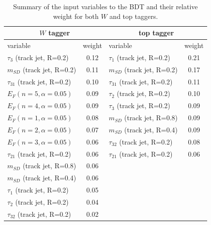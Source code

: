 \documentclass[a4paper,11pt]{article}
\newcommand{\mSD}{\ensuremath{m_{\ensuremath{SD}}}}
\begin{document}
\begin{table}[!htb]\centering
\begin{tabular}{| l | c | l | c |}
\hline
  \multicolumn{2}{|c|}{$W$ tagger}  & \multicolumn{2}{c|}{top tagger} \\
  \hline
 variable & weight & variable & weight \\
\hline
 $\tau_3$ (track jet, R=0.2)      & 0.12      & $\tau_1$ (track jet, R=0.2) & 0.21  \\
 $\mSD$  (track jet, R=0.2)      & 0.11      & $\mSD$  (track jet, R=0.2) & 0.17 \\
 $\tau_{31}$  (track jet, R=0.2) & 0.10     & $\tau_{31}$  (track jet, R=0.2)  & 0.11 \\
 $E_{F}(n=5,\alpha=0.05)$                               & 0.09     &  $\tau_2$ (track jet, R=0.2) & 0.10 \\
 $E_{F}(n=4,\alpha=0.05)$                               & 0.09     & $\tau_3$ (track jet, R=0.2) & 0.09 \\
 $E_{F}(n=1,\alpha=0.05)$                               & 0.08     & $\mSD$  (track jet, R=0.8)& 0.09 \\
 $E_{F}(n=2,\alpha=0.05)$                               & 0.07     &  $\mSD$  (track jet, R=0.4) & 0.09 \\
 $E_{F}(n=3,\alpha=0.05)$                               & 0.06     & $\tau_{32}$  (track jet, R=0.2) & 0.08 \\
 $\tau_{21}$  (track jet, R=0.2)& 0.06   & $\tau_{21}$  (track jet, R=0.2) & 0.06 \\
 $\mSD$  (track jet, R=0.8) & 0.06 &  &\\
 $\mSD$  (track jet, R=0.4) & 0.06 & & \\
 $\tau_1$ (track jet, R=0.2) & 0.05      &  &\\
 $\tau_2$ (track jet, R=0.2) & 0.04      &  &\\
 $\tau_{32}$  (track jet, R=0.2) & 0.02    &  &\\
\hline
\end{tabular}
\caption{Summary of the input variables to the BDT and their relative weight for both $W$ and top taggers.}
\label{tab:TMVA_summary}
\end{table}
\end{document}

